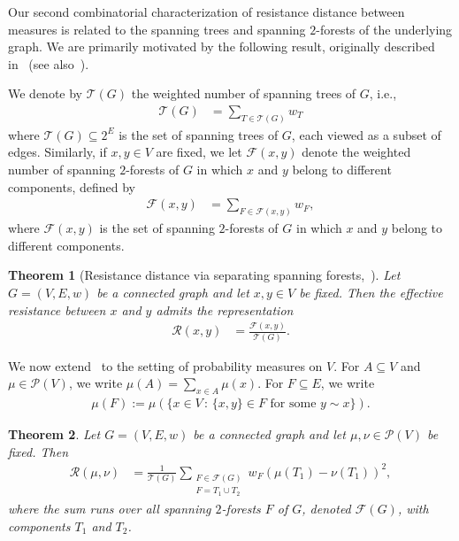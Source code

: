 \documentclass[11pt,a4paper]{article}
\newcommand{\Resis}{\mathcal{R}}
\newcommand{\Tree}{\mathcal{T}}
\newcommand{\Forest}{\mathcal{F}}
\newcommand{\Prob}{\mathscr{P}}
\newtheorem{theorem}{Theorem}[section]
\begin{document}
Our second combinatorial characterization of resistance distance between measures is related to the spanning trees and spanning $2$-forests of the underlying graph. We are primarily motivated by the following result, originally described in~\cite{bapat1999resistance} (see also~\cite{barrett2020spanning,chung2023forest}).

We denote by $\Tree(G)$ the weighted number of spanning trees of $G$, i.e.,
    \begin{align*}
        \Tree(G) &= \sum_{T\in \mathscr{T}(G)} w_{T}
    \end{align*}
where $\mathscr{T}(G)\subseteq 2^{E}$ is the set of spanning trees of $G$, each viewed as a subset of edges. Similarly, if $x,y\in V$ are fixed, we let $\Forest(x, y)$ denote the weighted number of spanning $2$-forests of $G$ in which $x$ and $y$ belong to different components, defined by
    \begin{align*}
        \Forest(x, y) &= \sum_{F\in \Forest (x, y)} w_{F},
    \end{align*}
where $\Forest (x, y)$ is the set of spanning $2$-forests of $G$ in which $x$ and $y$ belong to different components.

\begin{theorem}[Resistance distance via separating spanning forests,~\cite{bapat1999resistance}]\label{thm:spanning-two-forest}
    Let $G=(V,E,w)$ be a connected graph and let $x,y\in V$ be fixed. Then the effective resistance between $x$ and $y$ admits the representation
        \begin{align*}
            \Resis(x, y) &= \frac{\Forest(x, y)}{\Tree(G)}.
        \end{align*}
\end{theorem}

We now extend~ to the setting of probability measures on $V$. For $A\subseteq V$ and $\mu\in\Prob(V)$, we write $\mu(A) = \sum_{x\in A} \mu(x)$. For $F\subseteq E$, we write
    \begin{align*}
        \mu(F) := \mu(\{x\in V\,:\, \{x,y\}\in F\text{ for some }y\sim x\}).
    \end{align*}

\begin{theorem}\label{thm:measure-spanning-two-forest}
    Let $G=(V,E,w)$ be a connected graph and let $\mu,\nu\in\Prob(V)$ be fixed. Then 
        \begin{align*}
            \Resis(\mu,\nu) &= \frac{1}{\Tree(G)}\sum_{\substack{F\in\Forest (G) \\ F=T_1\cup T_2}} w_F (\mu(T_1)-\nu(T_1))^2,
        \end{align*}
    where the sum runs over all spanning $2$-forests $F$ of $G$, denoted $\Forest (G)$, with components $T_1$ and $T_2$.
\end{theorem}
\end{document}
